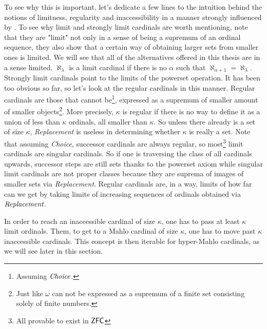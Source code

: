 \documentclass[12pt,a4paper]{article}
\begin{document}
To see why this is important, let's dedicate a few lines to the intuition behind the notions of limitness, regularity and inaccessibility in a manner strongly influenced by \cite{Infinity_in_mind}. To see why limit and strongly limit cardinals are worth mentioning, note that they are "limit" not only in a sense of being a supremum of an ordinal sequence, they also show that a certain way of obtaining larger sets from smaller ones is limited. We will see that all of the alternatives offered in this thesis are in a sense limited. 
$\aleph_\lambda$ is a limit cardinal if there is no $\alpha$ such that $\aleph_{\alpha+1}=\aleph_\lambda$. Strongly limit cardinals point to the limits of the powerset operation. It has been too obvious so far, so let's look at the regular cardinals in this manner. Regular cardinals are those that cannot be\footnote{Assuming $\emph{Choice}$.}, expressed as a supremum of smaller amount of smaller objects\footnote{Just like $\omega$ can not be expressed as a supremum of a finite set consisting solely of finite numbers.}. More precisely, $\kappa$ is regular if there is no way to define it as a union of less than $\kappa$ ordinals, all smaller than $\kappa$. So unless there already is a set of size $\kappa$, \emph{Replacement} is useless in determining whether $\kappa$ is really a set. Note that assuming \emph{Choice}, successor cardinals are always regular, so most\footnote{All provable to exist in $\sf{ZFC}$} limit cardinals are singular cardinals. So if one is traversing the class of all cardinals upwards, successor steps are still sets thanks to the powerset axiom while singular limit cardinals are not proper classes because they are suprema of images of smaller sets via \emph{Replacement}. Regular cardinals are, in a way, limits of how far can we get by taking limits of increasing sequences of ordinals obtained via $\emph{Replacement}$. 

In order to reach an inaccessible cardinal of size $\kappa$, one has to pass at least $\kappa$ limit ordinals. Them, to get to a Mahlo cardinal of size $\kappa$, one has to move past $\kappa$ inaccessible cardinals. This concept is then iterable for hyper-Mahlo cardinals, as we will see later in this section.

\end{document}
